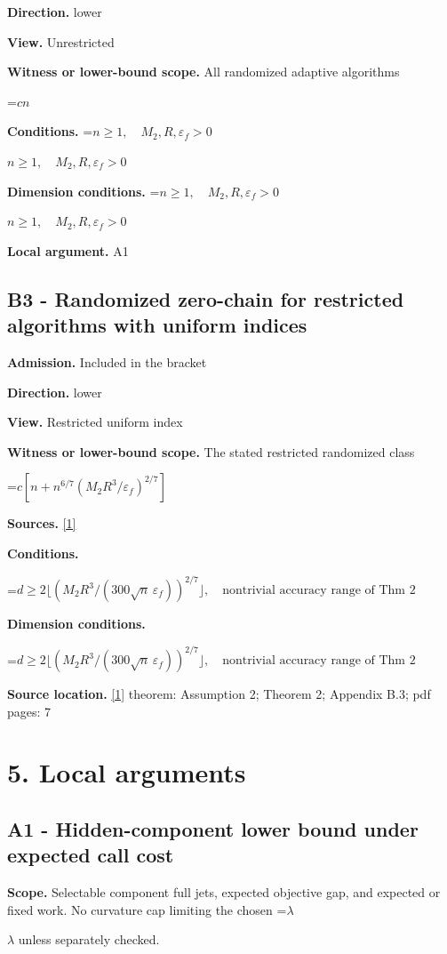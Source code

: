 \documentclass[10pt,a4paper]{article}
\newcommand{\AtlasMath}[1]{\par\begingroup\centering\setbox0=\hbox{$\displaystyle #1$}\ifdim\wd0>1.4\linewidth\typeout{ATLAS WIDE FORMULA: \the\wd0}\fi\ifdim\wd0>\linewidth\resizebox{\linewidth}{!}{\box0}\else\box0\fi\par\endgroup}
\newcommand{\AtlasInlineMath}[1]{\begingroup\setbox0=\hbox{$#1$}\ifdim\wd0>.4\linewidth\endgroup\AtlasMath{#1}\else\endgroup$#1$\fi}
\begin{document}
\textbf{Direction.} lower

\textbf{View.} Unrestricted

\textbf{Witness or lower-bound scope.} All randomized adaptive algorithms

\AtlasMath{cn}
\textbf{Conditions.} \AtlasInlineMath{n\ge1,\quad M_2,R,\varepsilon_f>0}

\textbf{Dimension conditions.} \AtlasInlineMath{n\ge1,\quad M_2,R,\varepsilon_f>0}

\textbf{Local argument.} A1

\subsection{B3 - Randomized zero-chain for restricted algorithms with uniform indices}
\textbf{Admission.} Included in the bracket

\textbf{Direction.} lower

\textbf{View.} Restricted uniform index

\textbf{Witness or lower-bound scope.} The stated restricted randomized class

\AtlasMath{c[n+n^{6/7}(M_2R^3/\varepsilon_f)^{2/7}]}
\textbf{Sources.} \href{https://arxiv.org/pdf/2610.10495v1}{[1]}

\textbf{Conditions.} 
\AtlasMath{d\ge2\lfloor(M_2R^3/(300\sqrt n\,\varepsilon_f))^{2/7}\rfloor,\quad\text{nontrivial accuracy range of Thm 2}}


\textbf{Dimension conditions.} 
\AtlasMath{d\ge2\lfloor(M_2R^3/(300\sqrt n\,\varepsilon_f))^{2/7}\rfloor,\quad\text{nontrivial accuracy range of Thm 2}}


\textbf{Source location.} \href{https://arxiv.org/pdf/2610.10495v1}{[1]} theorem: Assumption 2; Theorem 2; Appendix B.3; pdf pages: 7

\section{5. Local arguments}
\subsection{A1 - Hidden-component lower bound under expected call cost}
\textbf{Scope.} Selectable component full jets, expected objective gap, and expected or fixed work. No curvature cap limiting the chosen \AtlasInlineMath{\lambda} unless separately checked.
\end{document}
